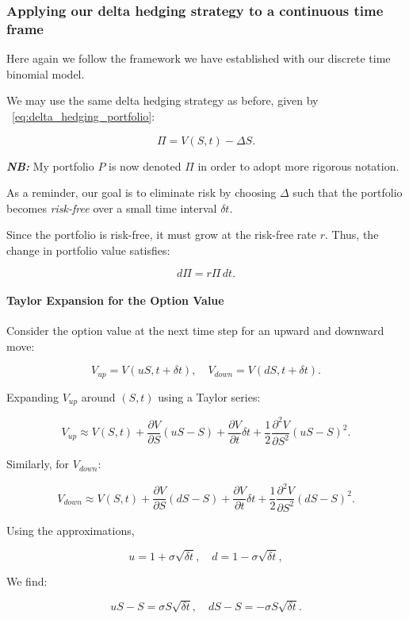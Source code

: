 \documentclass{article}
\begin{document}
\subsubsection{Applying our delta hedging strategy to a continuous time frame}
\label{sec:deriving_continuous}

Here again we follow the framework we have established with our discrete time binomial model.

We may use the same delta hedging strategy as before, given by ~\ref{eq:delta_hedging_portfolio}:

\[
    \Pi = V(S, t) - \Delta S.
\]

\noindent\textbf{\textit{NB:}} My portfolio $P$ is now denoted $\Pi$ in order to adopt more rigorous notation.


As a reminder, our goal is to eliminate risk by choosing \( \Delta \) such that the portfolio becomes \emph{risk-free} over a small time interval \( \delta t \).

Since the portfolio is risk-free, it must grow at the risk-free rate \( r \). Thus, the change in portfolio value satisfies:

\[
    d\Pi = r \Pi \, dt.
\]


\paragraph{Taylor Expansion for the Option Value}

Consider the option value at the next time step for an upward and downward move:

\[
    V_{up} = V(uS, t + \delta t), \quad V_{down} = V(dS, t + \delta t).
\]

Expanding \( V_{up} \) around \( (S, t) \) using a Taylor series:

\[
    V_{up} \approx V(S, t) + \frac{\partial V}{\partial S}(uS - S) + \frac{\partial V}{\partial t} \delta t + \frac{1}{2} \frac{\partial^2 V}{\partial S^2} (uS - S)^2.
\]

Similarly, for \( V_{down} \):

\[
    V_{down} \approx V(S, t) + \frac{\partial V}{\partial S}(dS - S) + \frac{\partial V}{\partial t} \delta t + \frac{1}{2} \frac{\partial^2 V}{\partial S^2} (dS - S)^2.
\]

Using the approximations,

\[
    u = 1 + \sigma \sqrt{\delta t}, \quad d = 1 - \sigma \sqrt{\delta t},
\]

We find:

\[
    uS - S = \sigma S \sqrt{\delta t}, \quad dS - S = -\sigma S \sqrt{\delta t}.
\]
\end{document}
